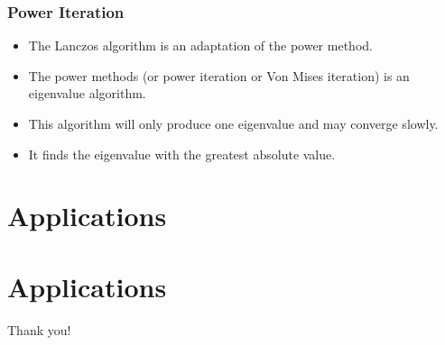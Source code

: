 \documentclass[pdf]{beamer}
\begin{document}
\begin{frame}
\frametitle{Power Iteration}
\begin{itemize}

\item The Lanczos algorithm is an adaptation of the power method.
\item The power methods (or power iteration or Von Mises iteration) is an eigenvalue algorithm.
\item This algorithm will only produce one eigenvalue and may converge slowly.
\item It finds the eigenvalue with the greatest absolute value.

\end{itemize}
\end{frame}



\section{Applications}

\begin{frame}
\tableofcontents[currentsection]
\end{frame}


\section{Applications}

\begin{frame}
\centering
Thank you!
\end{frame}
\end{document}
